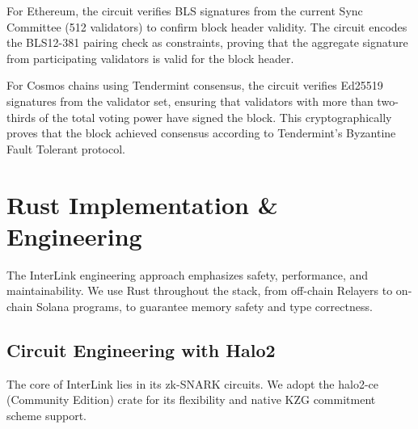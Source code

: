 \documentclass[11pt,a4paper]{article}
\begin{document}
For Ethereum, the circuit verifies BLS signatures from the current Sync Committee (512 validators) to confirm block header validity. The circuit encodes the BLS12-381 pairing check as constraints, proving that the aggregate signature from participating validators is valid for the block header.

For Cosmos chains using Tendermint consensus, the circuit verifies Ed25519 signatures from the validator set, ensuring that validators with more than two-thirds of the total voting power have signed the block. This cryptographically proves that the block achieved consensus according to Tendermint's Byzantine Fault Tolerant protocol.

\section{Rust Implementation \& Engineering}
\label{sec:impl}

The InterLink engineering approach emphasizes safety, performance, and maintainability. We use Rust throughout the stack, from off-chain Relayers to on-chain Solana programs, to guarantee memory safety and type correctness.

\subsection{Circuit Engineering with Halo2}
The core of InterLink lies in its zk-SNARK circuits. We adopt the halo2-ce (Community Edition) crate for its flexibility and native KZG commitment scheme support.
\end{document}
